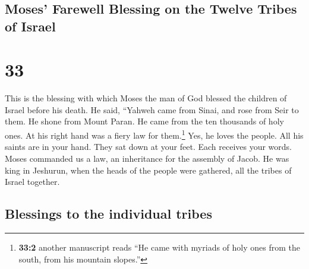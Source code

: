 \hypertarget{moses-farewell-blessing-on-the-twelve-tribes-of-israel}{%
\subsection{Moses' Farewell Blessing on the Twelve Tribes of
Israel}\label{moses-farewell-blessing-on-the-twelve-tribes-of-israel}}

\hypertarget{section-32}{%
\section{33}\label{section-32}}

 This is the blessing with which Moses the man of God
blessed the children of Israel before his death.  He said,
``Yahweh came from Sinai, and rose from Seir to them. He shone from
Mount Paran. He came from the ten thousands of holy ones. At his right
hand was a fiery law for them.\footnote{\textbf{33:2} another manuscript
  reads ``He came with myriads of holy ones from the south, from his
  mountain slopes.''}  Yes, he loves the people. All his
saints are in your hand. They sat down at your feet. Each receives your
words.  Moses commanded us a law, an inheritance for the
assembly of Jacob.  He was king in Jeshurun, when the
heads of the people were gathered, all the tribes of Israel together.

\hypertarget{blessings-to-the-individual-tribes}{%
\subsection{Blessings to the individual
tribes}\label{blessings-to-the-individual-tribes}}

